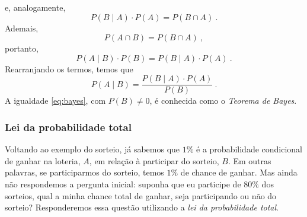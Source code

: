 \documentclass{article}
\begin{document}
            e, analogamente,
            \begin{equation*}
                P(B \mid A) \cdot P(A) = P(B \cap A)\ .
            \end{equation*}
            Ademais,
            \begin{equation*}
                P(A \cap B) = P(B \cap A)\ ,
            \end{equation*}
            portanto,
            \begin{equation*}
                P(A \mid B) \cdot P(B) = P(B \mid A) \cdot P(A)\ .
            \end{equation*}
            Rearranjando os termos, temos que
            \begin{equation}
            \label{eq:bayes}
                P(A \mid B) = \frac{P(B \mid A) \cdot P(A)}{P(B)}\ .
            \end{equation}
            A igualdade \eqref{eq:bayes}, com $P(B) \neq 0$, é conhecida como o \emph{Teorema de Bayes}.
            
            
            
                
            \subsubsection{Lei da probabilidade total}
            
                Voltando ao exemplo do sorteio, já sabemos que $1\%$ é a probabilidade condicional de ganhar na loteria, $A$, em relação à participar do sorteio, $B$. Em outras palavras, se participarmos do sorteio, temos $1\%$ de chance de ganhar. Mas ainda não respondemos a pergunta inicial: suponha que eu participe de $80\%$ dos sorteios, qual a minha chance total de ganhar, seja participando ou não do sorteio? Responderemos essa questão utilizando a \emph{lei da probabilidade total}.
                
\end{document}
